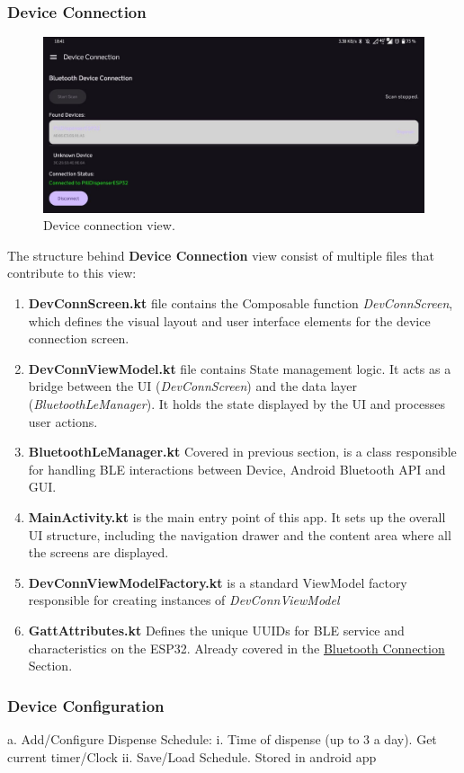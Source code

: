 \subsubsection{Device Connection}
\begin{figure}[h!]
	\centering
	\includegraphics[width=0.8\linewidth]{Figures/devConnView}
	\caption[Device connection view.]{Device connection view.}
	\label{fig:devconnview}
\end{figure}
The structure behind \textbf{Device Connection} view consist of multiple files that contribute to this view:
\begin{enumerate}
	\item \textbf{DevConnScreen.kt} file contains the Composable function \textit{DevConnScreen}, which defines the visual layout and user interface elements for the device connection screen.
	\item \textbf{DevConnViewModel.kt} file contains State management logic. It acts as a bridge between the UI (\textit{DevConnScreen}) and the data layer (\textit{BluetoothLeManager}). It holds the state displayed by the UI and processes user actions.
	\item \textbf{BluetoothLeManager.kt} Covered in previous section, is a class responsible for handling \ac{BLE} interactions between Device, Android Bluetooth \ac{API} and \ac{GUI}.
	\item \textbf{MainActivity.kt} is the main entry point of this app. It sets up the overall UI structure, including the navigation drawer and the content area where all the screens are displayed.
	\item \textbf{DevConnViewModelFactory.kt} is a standard ViewModel factory responsible for creating instances of \textit{DevConnViewModel}
	\item \textbf{GattAttributes.kt} Defines the unique UUIDs for \ac{BLE} service and characteristics on the ESP32. Already covered in the \hyperref[subsec:Bluetooth]{Bluetooth Connection} Section.
\end{enumerate}
\subsubsection{Device Configuration}
  a. Add/Configure Dispense Schedule:
  i. Time of dispense (up to 3 a day). Get current timer/Clock
  ii. Save/Load Schedule. Stored in android app
  
